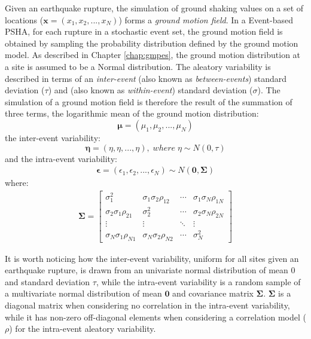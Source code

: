 Given an earthquake rupture, the simulation of ground shaking values on a set of locations ($\bm{x}=(x_{1}, x_{2}, ..., x_{N})$)
forms a \textit{ground motion field}. In a Event-based PSHA, for each rupture in a stochastic event set,
the ground motion field is obtained by sampling the probability distribution defined by the ground motion model.
As described in Chapter \ref{chap:gmpes}, the ground motion distribution at a site is assumed to be a Normal
distribution. The aleatory variability is described in terms of an \textit{inter-event} (also known as \textit{between-events})
standard deviation ($\tau$) and  (also known as \textit{within-event}) standard deviation ($\sigma$).
The simulation of a ground motion field is therefore the result of the summation of three terms, the logarithmic mean of the
ground motion distribution:
\begin{equation}
\bm\mu = (\mu_{1}, \mu_{2}, ..., \mu_{N})
\end{equation}
the inter-event variability:
\begin{equation}
\bm\eta = (\eta, \eta, ..., \eta),\;where\;\eta\sim N(0, \tau)
\end{equation}
and the intra-event variability:
\begin{align}
\bm\epsilon = (\epsilon_{1}, \epsilon_{2}, ..., \epsilon_{N}) \sim N(\bm{0}, \bm\Sigma)
\end{align}
where:
\begin{align}
\bm\Sigma = 
\begin{bmatrix}
\sigma_{1}^2&\sigma_{1}\sigma_{2}\rho_{12}&\cdots &\sigma_{1}\sigma_{N}\rho_{1N} \\
\sigma_{2}\sigma_{1}\rho_{21}&\sigma_{2}^2&\cdots &\sigma_{2}\sigma_{N}\rho_{2N} \\
\vdots & \vdots & \ddots & \vdots\\
\sigma_{N}\sigma_{1}\rho_{N1}&\sigma_{N}\sigma_{2}\rho_{N2}&\cdots &\sigma_{N}^2
\end{bmatrix}
\end{align}

It is worth noticing how the inter-event variability, uniform for all sites given an earthquake rupture, is drawn
from an univariate normal distribution of mean 0 and standard deviation $\tau$, while the intra-event variability
is a random sample of a multivariate normal distribution of mean $\bm{0}$ and covariance matrix $\bm\Sigma$.
$\bm\Sigma$ is a diagonal matrix when considering no correlation in the intra-event variability, while it has non-zero
off-diagonal elements when considering a correlation model ($\rho$) for the intra-event aleatory variability.

